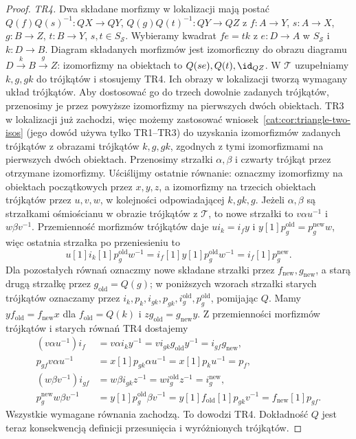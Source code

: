 \begin{proof}
\emph{TR4.} Dwa składane morfizmy w lokalizacji mają postać $Q(f)Q(s)^{-1}:QX\to QY$, $Q(g)Q(t)^{-1}:QY\to QZ$ z $f:A\to Y$, $s:A\to X$, $g:B\to Z$, $t:B\to Y$, $s,t\in S_{\mathcal S}$. Wybieramy kwadrat $fe=tk$ z $e:D\to A$ w $S_{\mathcal S}$ i $k:D\to B$. Diagram składanych morfizmów jest izomorficzny do obrazu diagramu $D\xrightarrow k B\xrightarrow g Z$: izomorfizmy na obiektach to $Q(se),Q(t),\id_{QZ}$. W $\mathcal T$ uzupełniamy $k,g,gk$ do trójkątów i stosujemy TR4. Ich obrazy w lokalizacji tworzą wymagany układ trójkątów. Aby dostosować go do trzech dowolnie zadanych trójkątów, przenosimy je przez powyższe izomorfizmy na pierwszych dwóch obiektach. TR3 w lokalizacji już zachodzi, więc możemy zastosować wniosek~\ref{cat:cor:triangle-two-isos} (jego dowód używa tylko TR1--TR3) do uzyskania izomorfizmów zadanych trójkątów z obrazami trójkątów $k,g,gk$, zgodnych z tymi izomorfizmami na pierwszych dwóch obiektach. Przenosimy strzałki $\alpha,\beta$ i czwarty trójkąt przez otrzymane izomorfizmy. Uściślijmy ostatnie równanie: oznaczmy izomorfizmy na obiektach początkowych przez $x,y,z$, a izomorfizmy na trzecich obiektach trójkątów przez $u,v,w$, w kolejności odpowiadającej $k,gk,g$. Jeżeli $\alpha,\beta$ są strzałkami ośmiościanu w obrazie trójkątów z $\mathcal T$, to nowe strzałki to $v\alpha u^{-1}$ i $w\beta v^{-1}$. Przemienność morfizmów trójkątów daje $u i_k=i_f y$ i $y[1]p_g^{\mathrm{old}}=p_g^{\mathrm{new}} w$, więc ostatnia strzałka po przeniesieniu to
\[
 u[1] i_k[1]p_g^{\mathrm{old}}w^{-1}
 =i_f[1]y[1]p_g^{\mathrm{old}}w^{-1}
 =i_f[1]p_g^{\mathrm{new}}.
\]
Dla pozostałych równań oznaczmy nowe składane strzałki przez $f_{\mathrm{new}},g_{\mathrm{new}}$, a starą drugą strzałkę przez $g_{\mathrm{old}}=Q(g)$; w poniższych wzorach strzałki starych trójkątów oznaczamy przez $i_k,p_k,i_{gk},p_{gk},i_g^{\mathrm{old}},p_g^{\mathrm{old}}$, pomijając $Q$. Mamy $yf_{\mathrm{old}}=f_{\mathrm{new}}x$ dla $f_{\mathrm{old}}=Q(k)$ i $zg_{\mathrm{old}}=g_{\mathrm{new}}y$. Z przemienności morfizmów trójkątów i starych równań TR4 dostajemy
\[
\begin{aligned}
 (v\alpha u^{-1})i_f&=v\alpha i_k y^{-1}
 =v i_{gk}g_{\mathrm{old}}y^{-1}=i_{gf}g_{\mathrm{new}},\\
 p_{gf}v\alpha u^{-1}&=x[1]p_{gk}\alpha u^{-1}
 =x[1]p_k u^{-1}=p_f,\\
 (w\beta v^{-1})i_{gf}&=w\beta i_{gk}z^{-1}
 =w i_g^{\mathrm{old}}z^{-1}=i_g^{\mathrm{new}},\\
 p_g^{\mathrm{new}}w\beta v^{-1}&=y[1]p_g^{\mathrm{old}}\beta v^{-1}
 =y[1]f_{\mathrm{old}}[1]p_{gk}v^{-1}
 =f_{\mathrm{new}}[1]p_{gf}.
\end{aligned}
\]
Wszystkie wymagane równania zachodzą. To dowodzi TR4. Dokładność $Q$ jest teraz konsekwencją definicji przesunięcia i wyróżnionych trójkątów.
\end{proof}
